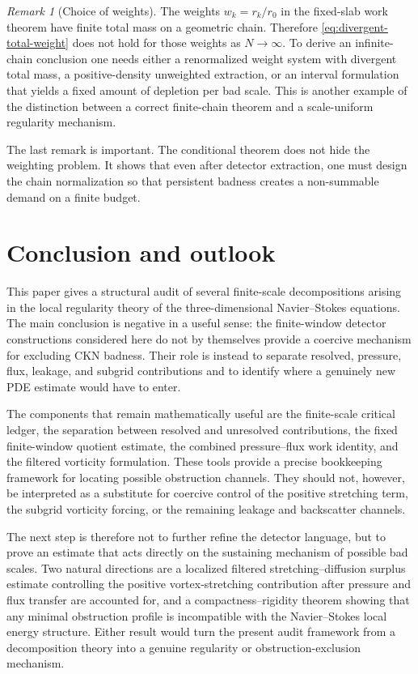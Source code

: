 \documentclass[11pt]{article}
\numberwithin{equation}{section}
\theoremstyle{remark}
\newtheorem{remark}[theorem]{Remark}
\begin{document}
\begin{remark}[Choice of weights]
The weights $w_k=r_k/r_0$ in the fixed-slab work theorem have finite total mass on a geometric chain. Therefore \eqref{eq:divergent-total-weight} does not hold for those weights as $N\to\infty$. To derive an infinite-chain conclusion one needs either a renormalized weight system with divergent total mass, a positive-density unweighted extraction, or an interval formulation that yields a fixed amount of depletion per bad scale. This is another example of the distinction between a correct finite-chain theorem and a scale-uniform regularity mechanism.
\end{remark}

The last remark is important. The conditional theorem does not hide the weighting problem. It shows that even after detector extraction, one must design the chain normalization so that persistent badness creates a non-summable demand on a finite budget.

\section{Conclusion and outlook}\label{sec:conclusion-outlook}\label{sec:agenda}

This paper gives a structural audit of several finite-scale decompositions arising in the local regularity theory of the three-dimensional Navier--Stokes equations. The main conclusion is negative in a useful sense: the finite-window detector constructions considered here do not by themselves provide a coercive mechanism for excluding CKN badness. Their role is instead to separate resolved, pressure, flux, leakage, and subgrid contributions and to identify where a genuinely new PDE estimate would have to enter.

The components that remain mathematically useful are the finite-scale critical ledger, the separation between resolved and unresolved contributions, the fixed finite-window quotient estimate, the combined pressure--flux work identity, and the filtered vorticity formulation. These tools provide a precise bookkeeping framework for locating possible obstruction channels. They should not, however, be interpreted as a substitute for coercive control of the positive stretching term, the subgrid vorticity forcing, or the remaining leakage and backscatter channels.

The next step is therefore not to further refine the detector language, but to prove an estimate that acts directly on the sustaining mechanism of possible bad scales. Two natural directions are a localized filtered stretching--diffusion surplus estimate controlling the positive vortex-stretching contribution after pressure and flux transfer are accounted for, and a compactness--rigidity theorem showing that any minimal obstruction profile is incompatible with the Navier--Stokes local energy structure. Either result would turn the present audit framework from a decomposition theory into a genuine regularity or obstruction-exclusion mechanism.
\end{document}
